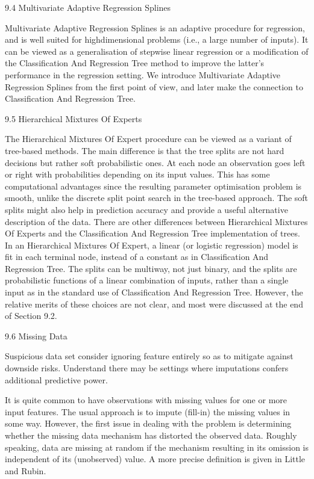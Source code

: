 9.4 Multivariate Adaptive Regression Splines

Multivariate Adaptive Regression Splines is an adaptive procedure for regression, and is well suited for highdimensional problems (i.e., a large number of inputs). It can be viewed as a generalisation of stepwise linear regression or a modification of the Classification And Regression Tree method to improve the latter's performance in the regression setting. We introduce Multivariate Adaptive Regression Splines from the first point of view, and later make the connection to Classification And Regression Tree.

9.5 Hierarchical Mixtures Of Experts

The Hierarchical Mixtures Of Expert procedure can be viewed as a
variant of tree-based methods. The main difference is that the tree splits are not hard decisions but rather soft probabilistic ones. At each node an observation goes left or right with probabilities depending on its input values. This has some computational advantages since the resulting parameter optimisation problem is smooth, unlike the discrete split point search in the tree-based approach. The soft splits might also help in prediction accuracy and provide a useful alternative description of the data. There are other differences between Hierarchical Mixtures Of Experts and the Classification And Regression Tree implementation of trees. In an Hierarchical Mixtures Of Expert, a linear (or logistic regression) model is fit in each terminal node, instead of a constant as in Classification And Regression Tree. The splits can be multiway, not just binary, and the splits are probabilistic functions of a linear combination of inputs, rather than a single input as in the standard use of Classification And Regression Tree. However, the relative merits of these choices are not clear, and most were discussed at the end of Section 9.2.

9.6 Missing Data

Suspicious data set consider ignoring feature entirely so as to mitigate against downside risks. Understand there may be settings where imputations confers additional predictive power.

It is quite common to have observations with missing values for one or more input features. The usual approach is to impute (fill-in) the missing values in some way. However, the first issue in dealing with the problem is determining whether the missing data mechanism has distorted the observed data. Roughly speaking, data are missing at random if the mechanism resulting in its omission is independent of its (unobserved) value. A more precise definition is given in Little and Rubin.

